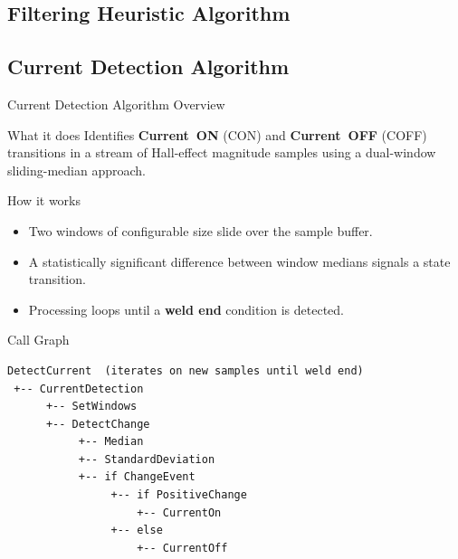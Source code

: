 \documentclass{beamer}
\begin{document}
\subsection{Filtering Heuristic Algorithm}
\subsection{Current Detection Algorithm}

\begin{frame}{Current Detection Algorithm Overview}
  \begin{block}{What it does}
    Identifies \textbf{Current~ON} (CON) and \textbf{Current~OFF} (COFF)
    transitions in a stream of Hall-effect magnitude samples using a
    dual-window sliding-median approach.
  \end{block}
  \vspace{0.5em}
  \begin{block}{How it works}
    \begin{itemize}
      \item Two windows of configurable size slide over the sample buffer.
      \item A statistically significant difference between window medians
            signals a state transition.
      \item Processing loops until a \textbf{weld end} condition is
            detected.
    \end{itemize}
  \end{block}
\end{frame}

\begin{frame}[fragile]{Call Graph}
  \begin{center}
  \begin{verbatim}
DetectCurrent  (iterates on new samples until weld end)
 +-- CurrentDetection
      +-- SetWindows
      +-- DetectChange
           +-- Median
           +-- StandardDeviation
           +-- if ChangeEvent
                +-- if PositiveChange
                    +-- CurrentOn
                +-- else
                    +-- CurrentOff
  \end{verbatim}
  \end{center}
\end{frame}
\end{document}

